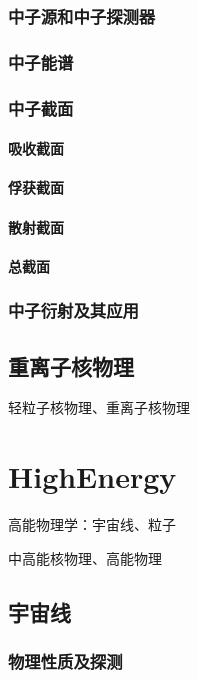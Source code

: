 \documentclass[UTF8]{../06-Physics}
\begin{document}
    \subsection{中子源和中子探测器}
    \subsection{中子能谱}
    \subsection{中子截面}
        \subsubsection{吸收截面}
        \subsubsection{俘获截面}
        \subsubsection{散射截面}
        \subsubsection{总截面}
    \subsection{中子衍射及其应用}

\section{重离子核物理}
轻粒子核物理、重离子核物理








\chapter{HighEnergy}

高能物理学：宇宙线、粒子


中高能核物理、高能物理

\section{宇宙线}
    \subsection{物理性质及探测}
\end{document}
